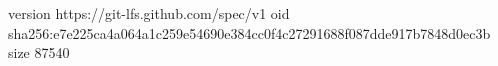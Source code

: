 version https://git-lfs.github.com/spec/v1
oid sha256:e7e225ca4a064a1c259e54690e384cc0f4c27291688f087dde917b7848d0ec3b
size 87540
